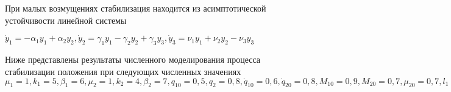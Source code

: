 При малых возмущениях стабилизация находится из асимптотической устойчивости линейной системы

$\dot y_1 = - \alpha_1 y_1 + \alpha_2 y_2, \dot y_2 = \gamma_1 y_1 - \gamma_2 y_2 + \gamma_3 y_3, \dot y_3 = \nu_1 y_1 + \nu_2 y_2 - \nu_3 y_3$

Ниже представлены результаты численного моделирования процесса стабилизации положения при следующих численных значениях $\mu_1 = 1, k_1 = 5, \beta_1 = 6, \mu_2 = 1, k_2 = 4, \beta_2 = 7, q_{10} = 0,5, q_2 = 0,8, \dot q_{10} = 0,6, \dot q_{20} = 0,8, M_{10} = 0,9, M_{20} = 0,7, \mu_{20} = 0,7, l_1 = 1 м, l_{g_2} = 0,5 м, I_1 = I_2 = 3,33 кг м 3, m_2 = 10 кг$ 
